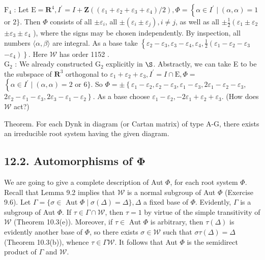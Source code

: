 \documentclass[10pt]{article}
\begin{document}
$\mathrm{F}_{4}$ : Let $\mathrm{E}=\mathbf{R}^{4}, I^{\prime}=I+\mathbf{Z}\left(\left(\varepsilon_{1}+\varepsilon_{2}+\varepsilon_{3}+\varepsilon_{4}\right) / 2\right), \Phi=\left\{\alpha \in I^{\prime} \mid(\alpha, \alpha)=1\right.$ or $2\}$. Then $\Phi$ consists of all $\pm \varepsilon_{i}$, all $\pm\left(\varepsilon_{i} \pm \varepsilon_{j}\right), i \neq j$, as well as all $\pm \frac{1}{2}\left(\varepsilon_{1} \pm \varepsilon_{2}\right.$ $\pm \varepsilon_{3} \pm \varepsilon_{4}$ ), where the signs may be chosen independently. By inspection, all numbers $\langle\alpha, \beta\rangle$ are integral. As a base take $\left\{\varepsilon_{2}-\varepsilon_{3}, \varepsilon_{3}-\varepsilon_{4}, \varepsilon_{4}, \frac{1}{2}\left(\varepsilon_{1}-\varepsilon_{2}-\varepsilon_{3}\right.\right.$ $\left.\left.-\varepsilon_{4}\right)\right\}$. Here $\mathscr{W}$ has order 1152 .\\
$\mathrm{G}_{2}$ : We already constructed $\mathrm{G}_{2}$ explicitly in $\S$. Abstractly, we can take E to be the subspace of $\mathbf{R}^{3}$ orthogonal to $\varepsilon_{1}+\varepsilon_{2}+\varepsilon_{3}, I^{\prime}=I \cap \mathrm{E}, \Phi=$ $\left\{\alpha \in I^{\prime} \mid(\alpha, \alpha)=2\right.$ or 6$\}$. So $\Phi= \pm\left\{\varepsilon_{1}-\varepsilon_{2}, \varepsilon_{2}-\varepsilon_{3}, \varepsilon_{1}-\varepsilon_{3}, 2 \varepsilon_{1}-\varepsilon_{2}-\varepsilon_{3}\right.$, $\left.2 \varepsilon_{2}-\varepsilon_{1}-\varepsilon_{3}, 2 \varepsilon_{3}-\varepsilon_{1}-\varepsilon_{2}\right\}$. As a base choose $\varepsilon_{1}-\varepsilon_{2},-2 \varepsilon_{1}+\varepsilon_{2}+\varepsilon_{3}$. (How does $\mathscr{W}$ act?)

Theorem. For each Dynk in diagram (or Cartan matrix) of type A-G, there exists an irreducible root system having the given diagram.

\subsection*{12.2. Automorphisms of $\mathbf{\Phi}$}
We are going to give a complete description of Aut $\Phi$, for each root system $\Phi$. Recall that Lemma 9.2 implies that $\mathscr{W}$ is a normal subgroup of Aut $\Phi$ (Exercise 9.6). Let $\Gamma=\{\sigma \in$ Aut $\Phi \mid \sigma(\Delta)=\Delta\}, \Delta$ a fixed base of $\Phi$. Evidently, $\Gamma$ is a subgroup of Aut $\Phi$. If $\tau \in \Gamma \cap \mathscr{W}$, then $\tau=1$ by virtue of the simple transitivity of $\mathscr{W}$ (Theorem 10.3(e)). Moreover, if $\tau \in$ Aut $\Phi$ is arbitrary, then $\tau(\Delta)$ is evidently another base of $\Phi$, so there exists $\sigma \in \mathscr{W}$ such that $\sigma \tau(\Delta)=\Delta$ (Theorem 10.3(b)), whence $\tau \in \Gamma \mathscr{W}$. It follows that Aut $\Phi$ is the semidirect product of $\Gamma$ and $\mathscr{W}$.
\end{document}
